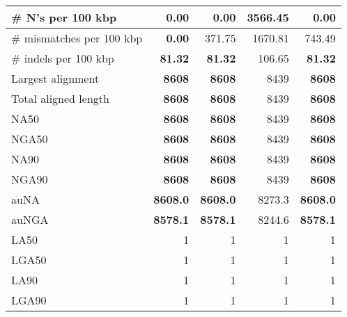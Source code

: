 \documentclass[12pt,a4paper]{article}
\begin{document}
\begin{table}[ht]
\begin{center}
\begin{tabular}{|l*{4}{|r}|}
\# N's per 100 kbp & {\bf 0.00} & {\bf 0.00} & 3566.45 & {\bf 0.00} \\ \hline
\# mismatches per 100 kbp & {\bf 0.00} & 371.75 & 1670.81 & 743.49 \\ \hline
\# indels per 100 kbp & {\bf 81.32} & {\bf 81.32} & 106.65 & {\bf 81.32} \\ \hline
Largest alignment & {\bf 8608} & {\bf 8608} & 8439 & {\bf 8608} \\ \hline
Total aligned length & {\bf 8608} & {\bf 8608} & 8439 & {\bf 8608} \\ \hline
NA50 & {\bf 8608} & {\bf 8608} & 8439 & {\bf 8608} \\ \hline
NGA50 & {\bf 8608} & {\bf 8608} & 8439 & {\bf 8608} \\ \hline
NA90 & {\bf 8608} & {\bf 8608} & 8439 & {\bf 8608} \\ \hline
NGA90 & {\bf 8608} & {\bf 8608} & 8439 & {\bf 8608} \\ \hline
auNA & {\bf 8608.0} & {\bf 8608.0} & 8273.3 & {\bf 8608.0} \\ \hline
auNGA & {\bf 8578.1} & {\bf 8578.1} & 8244.6 & {\bf 8578.1} \\ \hline
LA50 & 1 & 1 & 1 & 1 \\ \hline
LGA50 & 1 & 1 & 1 & 1 \\ \hline
LA90 & 1 & 1 & 1 & 1 \\ \hline
LGA90 & 1 & 1 & 1 & 1 \\ \hline
\end{tabular}
\end{center}
\end{table}
\end{document}
